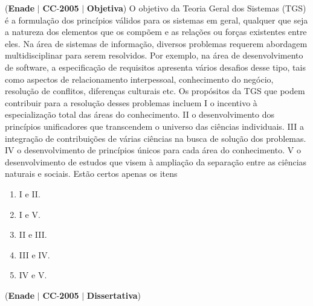 \documentclass{exam}
\begin{document}
\begin{questions}
\question (\textbf{Enade} $|$ \textbf{CC}-\textbf{2005} $|$ \textbf{Objetiva})
O objetivo da Teoria Geral dos Sistemas (TGS) é a formulação
dos princípios válidos para os sistemas em geral, qualquer que
seja a natureza dos elementos que os compõem e as relações ou
forças existentes entre eles. Na área de sistemas de informação,
diversos problemas requerem abordagem multidisciplinar para
serem resolvidos. Por exemplo, na área de desenvolvimento de
software, a especificação de requisitos apresenta vários desafios
desse tipo, tais como aspectos de relacionamento interpessoal,
conhecimento do negócio, resolução de conflitos, diferenças
culturais etc. Os propósitos da TGS que podem contribuir para
a resolução desses problemas incluem
I o incentivo à especialização total das áreas do
conhecimento.
II o desenvolvimento dos princípios unificadores que
transcendem o universo das ciências individuais.
III a integração de contribuições de várias ciências na busca de
solução dos problemas.
IV o desenvolvimento de princípios únicos para cada área do
conhecimento.
V o desenvolvimento de estudos que visem à ampliação da
separação entre as ciências naturais e sociais.
Estão certos apenas os itens
	\begin{enumerate}[label=\alph*)]
		\item  I e II.
		\item  I e V.
		\item  II e III.
		\item  III e IV.
		\item  IV e V.
	\end{enumerate}

\question (\textbf{Enade} $|$ \textbf{CC}-\textbf{2005} $|$ \textbf{Dissertativa})


\end{questions}
\end{document}
